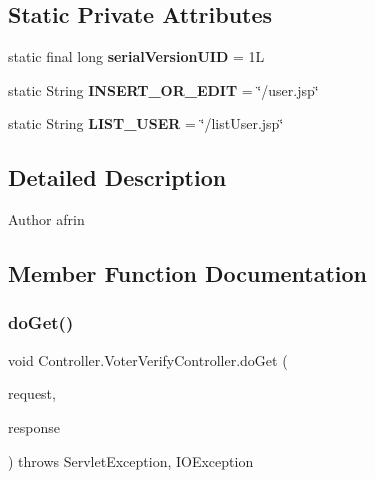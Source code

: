 \subsection*{Static Private Attributes}
\begin{DoxyCompactItemize}
\item 
\mbox{\label{class_controller_1_1_voter_verify_controller_a46832418c0875ad193a74ee350abddb9}} 
static final long {\bfseries serial\+Version\+U\+ID} = 1L
\item 
\mbox{\label{class_controller_1_1_voter_verify_controller_a6635c4e0a652a2175766549188df776f}} 
static String {\bfseries I\+N\+S\+E\+R\+T\+\_\+\+O\+R\+\_\+\+E\+D\+IT} = \char`\"{}/user.\+jsp\char`\"{}
\item 
\mbox{\label{class_controller_1_1_voter_verify_controller_a5b2f52d6fb98896653b78f91b63160ed}} 
static String {\bfseries L\+I\+S\+T\+\_\+\+U\+S\+ER} = \char`\"{}/list\+User.\+jsp\char`\"{}
\end{DoxyCompactItemize}


\subsection{Detailed Description}
\begin{DoxyAuthor}{Author}
afrin 
\end{DoxyAuthor}


\subsection{Member Function Documentation}
\mbox{\label{class_controller_1_1_voter_verify_controller_a8d8e998154d612d28890adc5b5135f74}} 
\subsubsection{\texorpdfstring{doGet()}{doGet()}}
{\footnotesize\ttfamily void Controller.\+Voter\+Verify\+Controller.\+do\+Get (\begin{DoxyParamCaption}\item[{Http\+Servlet\+Request}]{request,  }\item[{Http\+Servlet\+Response}]{response }\end{DoxyParamCaption}) throws Servlet\+Exception, I\+O\+Exception\hspace{0.3cm}{\ttfamily [protected]}}

